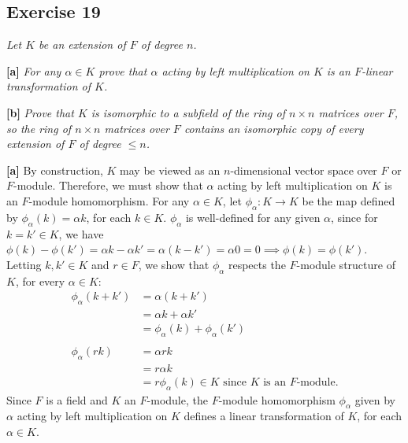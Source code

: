 \subsection*{Exercise 19}
\begin{framed}
\textit{Let $K$ be an extension of $F$ of degree $n$.}

\textbf{[a]} \textit{For any $\alpha \in K$ prove that $\alpha$ acting by left multiplication on $K$ is an $F$-linear transformation of $K$.}

\textbf{[b]} \textit{Prove that $K$ is isomorphic to a subfield of the ring of $n \times n$ matrices over $F$, so the ring of $n \times n$ matrices over $F$ contains an isomorphic copy of every extension of $F$ of degree $\le n$.}
\end{framed}

\textbf{[a]} By construction, $K$ may be viewed as an $n$-dimensional vector space over $F$ or $F$-module. Therefore, we must show that $\alpha$ acting by left multiplication on $K$ is an $F$-module homomorphism. For any $\alpha \in K$, let $\phi_\alpha: K \rightarrow K$ be the map defined by $\phi_\alpha(k) = \alpha k$, for each $k \in K$. $\phi_\alpha$ is well-defined for any given $\alpha$, since for $k = k' \in K$, we have $\phi(k) - \phi(k') = \alpha k - \alpha k' = \alpha(k - k') = \alpha 0 = 0 \implies \phi(k) = \phi(k')$. Letting $k, k' \in K$ and $r \in F$, we show that $\phi_\alpha$ respects the $F$-module structure of $K$, for every $\alpha \in K$:
\begin{align*}
    \phi_\alpha(k + k') &= \alpha(k + k') \\
    &= \alpha k + \alpha k' \\
    &= \phi_\alpha(k) + \phi_\alpha(k') \\
    \\
    \phi_\alpha(rk) &= \alpha rk \\
    &= r \alpha k \\
    &= r \phi_\alpha(k) \in K \text{ since $K$ is an $F$-module}.
\end{align*}
Since $F$ is a field and $K$ an $F$-module, the $F$-module homomorphism $\phi_\alpha$ given by $\alpha$ acting by left multiplication on $K$ defines a linear transformation of $K$, for each $\alpha \in K$.


